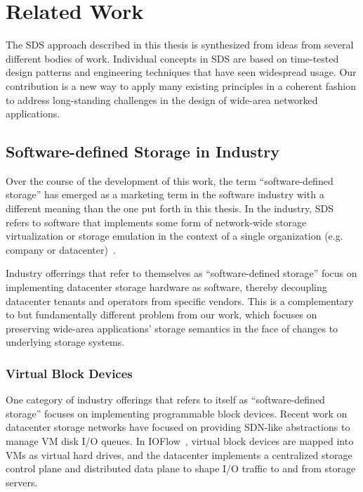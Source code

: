 \chapter{Related Work}
\label{chap:related-work}

The SDS approach described in this thesis
is synthesized from ideas from several different bodies of work.  Individual
concepts in SDS are based on time-tested design patterns and engineering
techniques that have seen widespread usage.  Our contribution is
a new way to apply many existing principles in a coherent fashion
to address long-standing challenges in
the design of wide-area networked applications.

\section{Software-defined Storage in Industry}

Over the course of the development of this work, the term ``software-defined
storage'' has emerged as a marketing term in the software
industry with a different meaning than the one put forth in this thesis.
In the industry, SDS refers to software that implements some form of 
network-wide storage virtualization or storage emulation
in the context of a single organization (e.g. company or datacenter)~\cite{techcenter-sds-definition}.

Industry offerrings that refer to themselves as ``software-defined storage''
focus on implementing datacenter storage hardware as software, thereby
decoupling datacenter tenants and operators from specific vendors.  This is a
complementary to but fundamentally different problem from our work, which
focuses on preserving wide-area applications' storage semantics in the face of
changes to underlying storage systems.

\subsection{Virtual Block Devices}

One category of industry offerings that refers to itself as ``software-defined
storage'' focuses on implementing programmable block devices.
Recent work on datacenter storage networks have focused on providing SDN-like
abstractions to manage VM disk I/O queues.  In
IOFlow~\cite{ioflow}, virtual block devices
are mapped into VMs as virtual hard drives, and the datacenter implements a
centralized storage control plane and distributed data plane to shape I/O traffic to and
from storage servers.

